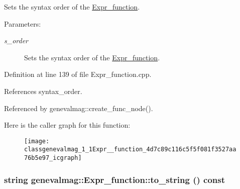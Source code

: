 Sets the syntax order of the \hyperlink{classgenevalmag_1_1Expr__function}{Expr\_\-function}. \begin{Desc}
\item[Parameters:]
\begin{description}
\item[{\em s\_\-order}]Sets the syntax order of the \hyperlink{classgenevalmag_1_1Expr__function}{Expr\_\-function}. \end{description}
\end{Desc}


Definition at line 139 of file Expr\_\-function.cpp.

References syntax\_\-order.

Referenced by genevalmag::create\_\-func\_\-node().

Here is the caller graph for this function:\nopagebreak
\begin{figure}[H]
\begin{center}
\leavevmode
\texttt{[image: classgenevalmag\_1\_1Expr\_\_function\_4d7c89c116c5f5f081f3527aa76b5e97\_icgraph]}
\end{center}
\end{figure}
\hypertarget{classgenevalmag_1_1Expr__function_daaebd5427337bb2288c47a16af804d8}{
\subsubsection[{to\_\-string}]{\setlength{\rightskip}{0pt plus 5cm}string genevalmag::Expr\_\-function::to\_\-string () const}}
\label{classgenevalmag_1_1Expr__function_daaebd5427337bb2288c47a16af804d8}


